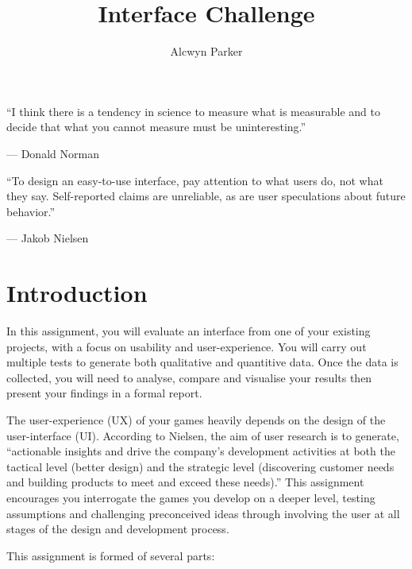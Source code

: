 \documentclass{../../../fal_assignment}
\title{Interface Challenge}
\author{Alcwyn Parker}
\begin{document}
\maketitle

\begin{marginquote}
    ``I think there is a tendency in science to measure what is measurable and to decide that what you cannot measure must be uninteresting.''
    
    --- Donald Norman
    
    \marginquoterule
    
    ``To design an easy-to-use interface, pay attention to what users do, not what they say. Self-reported claims are unreliable, as are user speculations about future behavior.''
    
    --- Jakob Nielsen
\end{marginquote}

\section*{Introduction}

In this assignment, you will evaluate an interface from one of your existing projects, with a focus on usability and user-experience. You will carry out multiple tests to generate both qualitative and quantitive data. Once the data is collected, you will need to analyse, compare and visualise your results then present your findings in a formal report.

The user-experience (UX) of your games heavily depends on the design of the user-interface (UI). According to Nielsen, the aim of user research is to generate, ``actionable insights and drive the company's development activities at both the tactical level (better design) and the strategic level (discovering customer needs and building products to meet and exceed these needs).'' This assignment encourages you interrogate the games you develop on a deeper level, testing assumptions and challenging preconceived ideas through involving the user at all stages of the design and development process. 

This assignment is formed of several parts:
\end{document}
